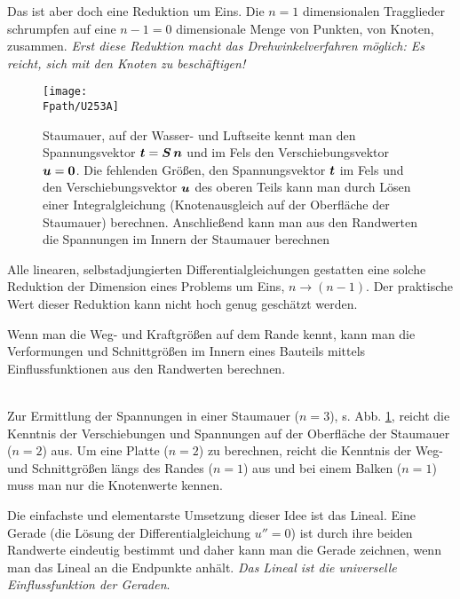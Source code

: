 Das ist aber doch eine Reduktion um Eins. Die $n = 1$ dimensionalen Tragglieder schrumpfen auf eine $n - 1 = 0$ dimensionale Menge von Punkten, von Knoten, zusammen. {\em Erst diese Reduktion macht das  Drehwinkelverfahren m\"{o}glich: Es reicht, sich mit den Knoten zu besch\"{a}ftigen!\/}
\begin{figure}[tbp]
\centering
\if {} \sidecaption \fi
\texttt{[image: \\Fpath/U253A]}
\caption{Staumauer, auf der Wasser- und Luftseite kennt man den Spannungsvektor $\mbox{\boldmath $t$} = \mbox{\boldmath $S$}\,\mbox{\boldmath $n$}$ und im Fels den Verschiebungsvektor $\mbox{\boldmath $u$} = \mbox{\boldmath $0$}$. Die fehlenden Gr\"{o}{\ss}en, den Spannungsvektor $\mbox{\boldmath $t$}$ im Fels und den Verschiebungsvektor $\mbox{\boldmath $u$}$ des oberen Teils kann man durch L\"{o}sen einer Integralgleichung (\glq Knotenausgleich auf der Oberfl\"{a}che der Staumauer\grq{}) berechnen. Anschlie{\ss}end kann man aus den Randwerten die Spannungen im Innern der Staumauer berechnen} \label{U253}
\end{figure}%

Alle linearen, selbstadjungierten Differentialgleichungen gestatten eine solche Reduktion der Dimension eines Problems um Eins, $n \to (n-1)$. Der praktische Wert dieser Reduktion kann nicht hoch genug gesch\"{a}tzt werden.\\

\hspace*{-12pt}\colorbox{highlightBlue}{\parbox{0.98\textwidth}{Wenn man die Weg- und Kraftgr\"{o}{\ss}en auf dem Rande kennt,  kann man die Verformungen und Schnittgr\"{o}{\ss}en im Innern eines Bauteils mittels Einflussfunktionen aus den Randwerten berechnen.}}
\\

Zur Ermittlung der Spannungen in einer Staumauer ($n = 3$), s. Abb. \ref{U253}, reicht die Kenntnis der Verschiebungen und Spannungen auf der Oberfl\"{a}che der Staumauer ($n = 2$) aus. Um eine Platte ($n = 2$) zu berechnen, reicht die Kenntnis der Weg- und Schnittgr\"{o}{\ss}en l\"{a}ngs des Randes ($n = 1$) aus und bei einem Balken ($n = 1$) muss man nur die Knotenwerte kennen.

Die einfachste und elementarste Umsetzung dieser Idee ist das Lineal. Eine Gerade (die L\"{o}sung der Differentialgleichung $u'' = 0$) ist durch ihre beiden Randwerte eindeutig bestimmt und daher kann man die Gerade zeichnen, wenn man das Lineal an die Endpunkte anh\"{a}lt. {\em Das Lineal ist die universelle Einflussfunktion der Geraden\/}.

